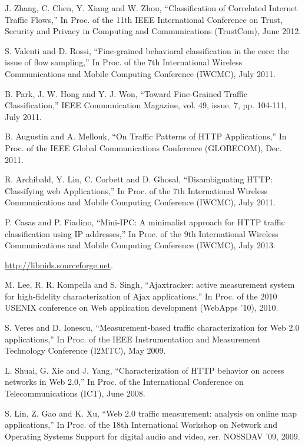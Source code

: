 \begin{thebibliography}{1}
J. Zhang, C. Chen, Y. Xiang and W. Zhou, 
``Classification of Correlated Internet Traffic Flows,'' In Proc. of the 11th IEEE International Conference on Trust, Security and Privacy in Computing and Communications (TrustCom), June 2012.

S. Valenti and D. Rossi, 
``Fine-grained behavioral classification in the core: the issue of flow sampling,'' In Proc. of the 7th International Wireless Communications and Mobile Computing Conference (IWCMC), July 2011.
 
B. Park, J. W. Hong and Y. J. Won,
``Toward Fine-Grained Traffic Classification,'' IEEE Communication Magazine, vol. 49, issue. 7, pp. 104-111, July 2011. 
 
B. Augustin and A. Mellouk,
``On Traffic Patterns of HTTP Applications,'' In Proc. of the IEEE Global Communications Conference (GLOBECOM), Dec. 2011. 
 
R. Archibald, Y. Liu, C. Corbett and D. Ghosal, 
``Disambiguating HTTP: Classifying web Applications,'' In Proc. of the 7th International Wireless Communications and Mobile Computing Conference (IWCMC), July 2011.

P. Casas and P. Fiadino, 
``Mini-IPC: A minimalist approach for HTTP traffic classification using IP addresses,'' In Proc. of the 9th International Wireless Communications and Mobile Computing Conference (IWCMC), July 2013.
 
\url{http://libnids.sourceforge.net}.  

M. Lee, R. R. Kompella and S. Singh, 
``Ajaxtracker: active measurement system for high-fidelity characterization of Ajax applications,'' In Proc. of the 2010 USENIX conference on Web application development (WebApps '10), 2010.  

S. Veres and D. Ionescu, 
``Measurement-based traffic characterization for Web 2.0 applications,'' In Proc. of the IEEE Instrumentation and Measurement Technology Conference (I2MTC), May 2009.
 
L. Shuai, G. Xie and J. Yang,
``Characterization of HTTP behavior on access networks in Web 2.0,'' In Proc. of the International Conference on Telecommunications (ICT), June 2008.

S. Lin, Z. Gao and K. Xu, 
``Web 2.0 traffic measurement: analysis on online map applications,'' In Proc. of the 18th International Workshop on Network and Operating Systems Support for digital audio and video, ser. NOSSDAV ’09, 2009.


\end{thebibliography}
